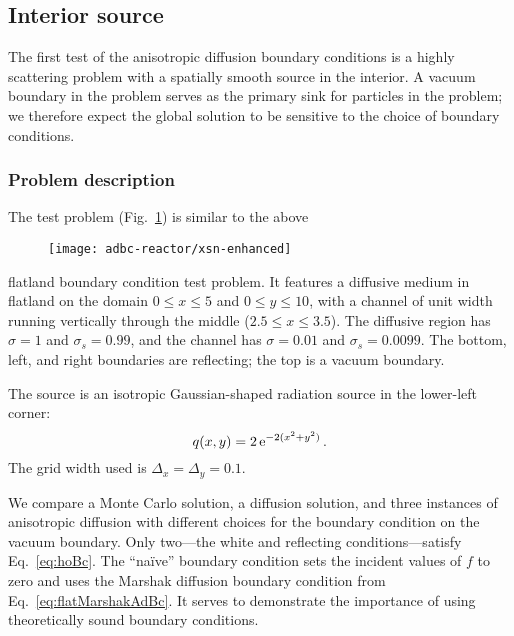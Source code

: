 \subsection{Interior source}

The first test of the anisotropic diffusion boundary conditions is a highly
scattering problem with a spatially smooth source in the interior. A vacuum
boundary in the problem serves as the primary sink for particles in the
problem; we therefore expect the global solution to be sensitive to the choice
of boundary conditions.

\subsubsection{Problem description}

The test problem (Fig.~\ref{fig:bcReactorProblem}) is similar to the above
%
\begin{figure}[htb]
  \centering
  \texttt{[image: adbc-reactor/xsn-enhanced]}
  \label{fig:bcReactorProblem}
\end{figure}
%
flatland boundary condition test
problem. It features a diffusive medium in flatland on the domain $0
\le x \le 5$ and $0 \le y \le 10$, with a channel of unit width running
vertically through the middle ($2.5 \le x \le 3.5$). The diffusive region has
$\sigma=1$ and $\sigma_s=0.99$, and the channel has $\sigma=0.01$ and
$\sigma_s=0.0099$. The bottom, left, and right boundaries are reflecting; the
top is a vacuum boundary.

The source is an isotropic Gaussian-shaped radiation source in the lower-left
corner:
\begin{equation*}
  q(x,y) = 2 \mathop{}\!\mathrm{e}^{-2 (x^2 + y^2) } \,.
\end{equation*}
The grid width used is $\Delta_x = \Delta_y = 0.1$.

We compare a Monte Carlo solution, a diffusion solution, and three instances of
anisotropic diffusion with different choices for the boundary condition on the
vacuum boundary. Only two---the white and reflecting
conditions---satisfy Eq.~\eqref{eq:hoBc}. The ``na\"ive'' boundary condition
sets the incident values of $f$ to zero and uses the Marshak diffusion boundary
condition from Eq.~\eqref{eq:flatMarshakAdBc}. It serves to demonstrate the
importance of using theoretically sound boundary conditions.

